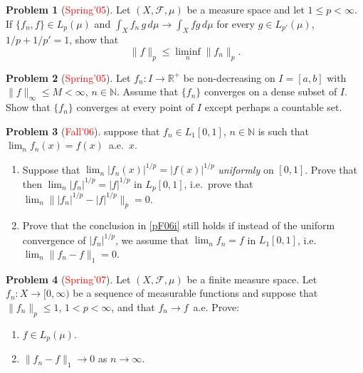 \documentclass[12pt,reqno]{amsart}
\def\field#1{\mathbb{#1}}
\def\abs#1{\lvert {#1} \rvert}
\def\Lpnorm#1#2{\lVert {#1} \rVert_{#2}}
\theoremstyle{definition}
\newtheorem{problem}{Problem}
\theoremstyle{remark}
\begin{document}
\begin{problem}[\textcolor{red}{Spring'05}]
  Let $(X, \mathcal{F}, \mu)$ be a measure space and let $1 \leq p <
  \infty$. If $\{ f_n, f\} \in L_p(\mu)$ and $\int_X f_n\, g\, d\mu
  \to \int_X fg\, d\mu$ for every $g \in L_{p'}(\mu)$, $1/p + 1/p'=1$,
  show that
  \begin{equation*}
    \Lpnorm{f}{p} \leq \liminf_n \Lpnorm{f_n}{p}.
  \end{equation*}
\end{problem}
\begin{problem}[\textcolor{red}{Spring'05}]
  Let $f_n \colon I \to \field{R}^+$ be non-decreasing on $I=[a,b]$
  with $\Lpnorm{f}{\infty} \leq M < \infty$, $n \in \field{N}$.
  Assume that $\{ f_n \}$ converges on a dense subset of $I$.  Show
  that $\{ f_n \}$ converges at every point of $I$ except perhaps a
  countable set.
\end{problem}
\begin{problem}[\textcolor{red}{Fall'06}]
  suppose that $f_n \in L_1[0,1]$, $n \in \field{N}$ is such that
  $\lim_n f_n(x) = f(x)$~a.e.~$x$.
  \begin{enumerate}
  \item \label{pF06i} Suppose that $\lim_n \abs{f_n(x)}^{1/p} =
    \abs{f(x)}^{1/p}$ \emph{uniformly} on $[0,1]$.  Prove that then
    $\lim_n \abs{f_n}^{1/p} = \abs{f}^{1/p}$ in $L_p[0,1]$, i.e.~prove
    that $\lim_n \big\lVert \abs{f_n}^{1/p} - \abs{f}^{1/p}
    \big\rVert_{p} = 0$.
  \item Prove that the conclusion in \ref{pF06i} still holds if
    instead of the uniform convergence of $\abs{f_n}^{1/p}$, we assume
    that $\lim_n f_n = f$ in $L_1[0,1]$, i.e.~$\lim_n \Lpnorm{f_n -
      f}{1}=0$.
  \end{enumerate}
\end{problem}
\begin{problem}[\textcolor{red}{Spring'07}]
  Let $(X, \mathcal{F}, \mu)$ be a finite measure space.  Let $f_n
  \colon X \to [0,\infty)$ be a sequence of measurable functions and
  suppose that $\Lpnorm{f_n}{p} \leq 1$, $1<p<\infty$, and that $f_n
  \to f$~a.e. Prove:
  \begin{enumerate}
  \item $f \in L_p(\mu)$.
  \item $\Lpnorm{f_n - f}{1} \to 0$ as $n \to \infty$.
  \end{enumerate}
\end{problem}
\end{document}
